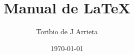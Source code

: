 \newcommand{\HRule}[1]{\rule{\linewidth}{#1}} %
\setcounter{tocdepth}{2}
\setcounter{secnumdepth}{3}

\title{Manual de \LaTeX}
\author{Toribio de J Arrieta}
\date{\today}
